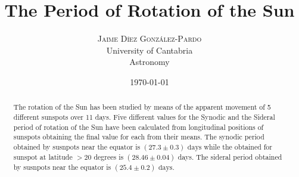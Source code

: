 \documentclass[twoside]{article}
\title{
	\vspace{-15mm}
	\fontsize{28pt}{10pt}
	\selectfont\textbf{The Period of Rotation of the Sun}%
}
\author{
	\large
	\textsc{Jaime Díez González-Pardo}\\[4mm]%
	\fontsize{28pt}{10pt} University of Cantabria \\ %
	\normalsize Astronomy \\ 
}
\date{ \usdate\today }
\begin{document}
	\maketitle %


	\thispagestyle{fancy} %


	\begin{abstract}

		\noindent%

		The rotation of the Sun has been studied by means of the apparent movement of 5 different sunspots over 11 days. Five different values for the Synodic and the Sideral period of rotation of the Sun have been calculated from longitudinal positions of sunspots obtaining the final value for each from their means. The synodic period obtained by susnpots near the equator is $(27.3 \pm 0.3) \textrm{ days}$ while the obtained for sunspot at latitude $>20$ degrees is $(28.46 \pm 0.04)$ days. The sideral period obtained by susnpots near the equator is $(25.4 \pm 0.2) \textrm{ days}$.

	\end{abstract}

\end{document}
